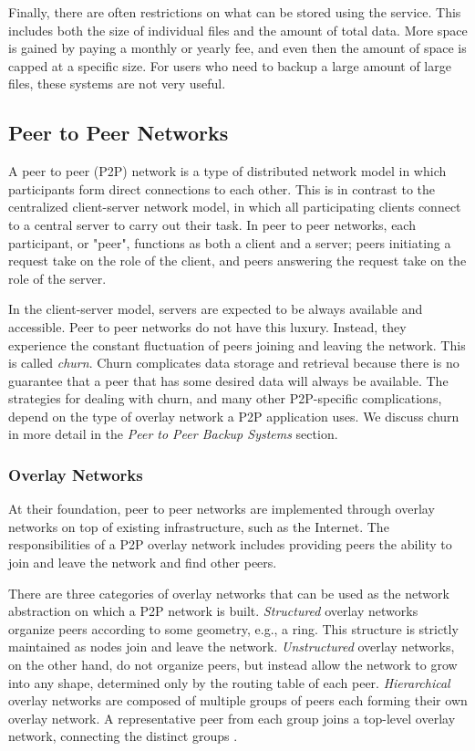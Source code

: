 \documentclass[a4paper]{article}
\begin{document}
Finally, there are often restrictions on what can be stored using the service. This includes both the size of individual files and the amount of total data. More space is gained by paying a monthly or yearly fee, and even then the amount of space is capped at a specific size. For users who need to backup a large amount of large files, these systems are not very useful.


\subsection{Peer to Peer Networks}

A peer to peer (P2P) network is a type of distributed network model in which participants form direct connections to each other. This is in contrast to the centralized client-server network model, in which all participating clients connect to a central server to carry out their task. In peer to peer networks, each participant, or "peer", functions as both a client and a server; peers initiating a request take on the role of the client, and peers answering the request take on the role of the server.

In the client-server model, servers are expected to be always available and accessible. Peer to peer networks do not have this luxury. Instead, they experience the constant fluctuation of peers joining and leaving the network. This is called \textit{churn}. Churn complicates data storage and retrieval because there is no guarantee that a peer that has some desired data will always be available. The strategies for dealing with churn, and many other P2P-specific complications, depend on the type of overlay network a P2P application uses. We discuss churn in more detail in the \textit{Peer to Peer Backup Systems} section.

\subsubsection{Overlay Networks}

At their foundation, peer to peer networks are implemented through overlay networks on top of existing infrastructure, such as the Internet. The responsibilities of a P2P overlay network includes providing peers the ability to join and leave the network and find other peers. 

There are three categories of overlay networks that can be used as the network abstraction on which a P2P network is built. \textit{Structured} overlay networks organize peers according to some geometry, e.g., a ring. This structure is strictly maintained as nodes join and leave the network. \textit{Unstructured} overlay networks, on the other hand, do not organize peers, but instead allow the network to grow into any shape, determined only by the routing table of each peer. \textit{Hierarchical} overlay networks are composed of multiple groups of peers each forming their own overlay network. A representative peer from each group joins a top-level overlay network, connecting the distinct groups \cite{p2pSurvey}. 
\end{document}
